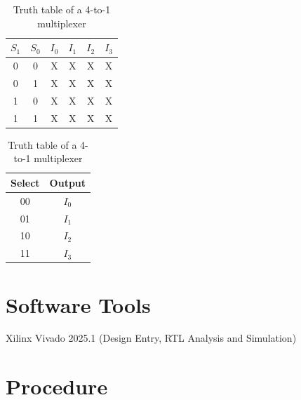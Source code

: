 \documentclass[12pt,a4paper]{report}
\begin{document}
\begin{table}[H]
    \centering
    \begin{tabular}{|c|c|c|c|c|c|}
        \hline
        \textbf{$S_1$} & \textbf{$S_0$} & \textbf{$I_0$} & \textbf{$I_1$} & \textbf{$I_2$} & \textbf{$I_3$} \\
        \hline
        0 & 0 & X & X & X & X \\
        \hline
        0 & 1 & X & X & X & X \\
        \hline
        1 & 0 & X & X & X & X \\
        \hline
        1 & 1 & X & X & X & X \\
        \hline
    \end{tabular}
    \qquad
    \begin{tabular}{|c|c|}
        \hline
        \textbf{Select} & \textbf{Output} \\
        \hline
        00 & $I_0$ \\
        \hline
        01 & $I_1$ \\
        \hline
        10 & $I_2$ \\
        \hline
        11 & $I_3$ \\
        \hline
    \end{tabular}
    \caption{Truth table of a 4-to-1 multiplexer}
    \label{tab:4to1_mux_behavioral}
\end{table}

\section{Software Tools}

Xilinx Vivado 2025.1 (Design Entry, RTL Analysis and Simulation)

\section{Procedure}
\end{document}
